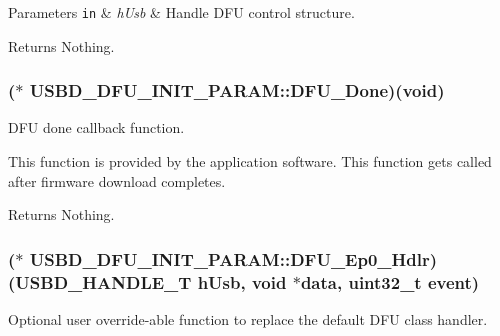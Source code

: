 \begin{DoxyParams}[1]{Parameters}
\mbox{\tt in}  & {\em h\-Usb} & Handle D\-F\-U control structure. \\
\hline
\end{DoxyParams}
\begin{DoxyReturn}{Returns}
Nothing. 
\end{DoxyReturn}
\hypertarget{structUSBD__DFU__INIT__PARAM_acab8981342b48fbc9b53503dd0161f0c}{
\subsubsection[{D\-F\-U\-\_\-\-Done}]{($\ast$ U\-S\-B\-D\-\_\-\-D\-F\-U\-\_\-\-I\-N\-I\-T\-\_\-\-P\-A\-R\-A\-M\-::\-D\-F\-U\-\_\-\-Done)({\bf void})}}\label{structUSBD__DFU__INIT__PARAM_acab8981342b48fbc9b53503dd0161f0c}
D\-F\-U done callback function.

This function is provided by the application software. This function gets called after firmware download completes.

\begin{DoxyReturn}{Returns}
Nothing. 
\end{DoxyReturn}
\hypertarget{structUSBD__DFU__INIT__PARAM_aed01890d2b8be51876c75f4541425529}{
\subsubsection[{D\-F\-U\-\_\-\-Ep0\-\_\-\-Hdlr}]{($\ast$ U\-S\-B\-D\-\_\-\-D\-F\-U\-\_\-\-I\-N\-I\-T\-\_\-\-P\-A\-R\-A\-M\-::\-D\-F\-U\-\_\-\-Ep0\-\_\-\-Hdlr)({\bf U\-S\-B\-D\-\_\-\-H\-A\-N\-D\-L\-E\-\_\-\-T} h\-Usb, {\bf void} $\ast$data, uint32\-\_\-t event)}}\label{structUSBD__DFU__INIT__PARAM_aed01890d2b8be51876c75f4541425529}
Optional user override-\/able function to replace the default D\-F\-U class handler.

